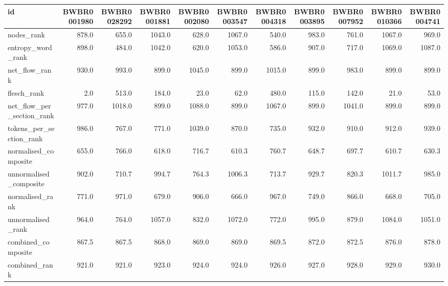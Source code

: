 \begin{tabular}{lrrrrrrrrrr}
\toprule
id & BWBR0001980 & BWBR0028292 & BWBR0001881 & BWBR0002080 & BWBR0003547 & BWBR0004318 & BWBR0003895 & BWBR0007952 & BWBR0010366 & BWBR0004741 \\
\midrule
nodes\_rank & 878.0 & 655.0 & 1043.0 & 628.0 & 1067.0 & 540.0 & 983.0 & 761.0 & 1067.0 & 969.0 \\
\cline{1-11}
entropy\_word\_rank & 898.0 & 484.0 & 1042.0 & 620.0 & 1053.0 & 586.0 & 907.0 & 717.0 & 1069.0 & 1087.0 \\
\cline{1-11}
net\_flow\_rank & 930.0 & 993.0 & 899.0 & 1045.0 & 899.0 & 1015.0 & 899.0 & 983.0 & 899.0 & 899.0 \\
\cline{1-11}
flesch\_rank & 2.0 & 513.0 & 184.0 & 23.0 & 62.0 & 480.0 & 115.0 & 142.0 & 21.0 & 53.0 \\
\cline{1-11}
net\_flow\_per\_section\_rank & 977.0 & 1018.0 & 899.0 & 1088.0 & 899.0 & 1067.0 & 899.0 & 1041.0 & 899.0 & 899.0 \\
\cline{1-11}
tokens\_per\_section\_rank & 986.0 & 767.0 & 771.0 & 1039.0 & 870.0 & 735.0 & 932.0 & 910.0 & 912.0 & 939.0 \\
\cline{1-11}
normalised\_composite & 655.0 & 766.0 & 618.0 & 716.7 & 610.3 & 760.7 & 648.7 & 697.7 & 610.7 & 630.3 \\
\cline{1-11}
unnormalised\_composite & 902.0 & 710.7 & 994.7 & 764.3 & 1006.3 & 713.7 & 929.7 & 820.3 & 1011.7 & 985.0 \\
\cline{1-11}
normalised\_rank & 771.0 & 971.0 & 679.0 & 906.0 & 666.0 & 967.0 & 749.0 & 866.0 & 668.0 & 705.0 \\
\cline{1-11}
unnormalised\_rank & 964.0 & 764.0 & 1057.0 & 832.0 & 1072.0 & 772.0 & 995.0 & 879.0 & 1084.0 & 1051.0 \\
\cline{1-11}
combined\_composite & 867.5 & 867.5 & 868.0 & 869.0 & 869.0 & 869.5 & 872.0 & 872.5 & 876.0 & 878.0 \\
\cline{1-11}
combined\_rank & 921.0 & 921.0 & 923.0 & 924.0 & 924.0 & 926.0 & 927.0 & 928.0 & 929.0 & 930.0 \\
\cline{1-11}
\bottomrule
\end{tabular}
